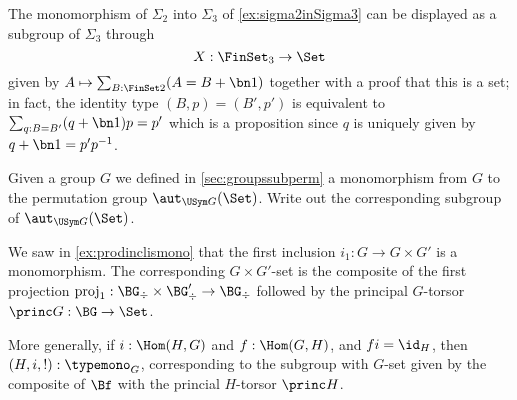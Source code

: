 %
  \begin{example}
    The monomorphism of $\Sigma_2$ into $\Sigma_3$ of \cref{ex:sigma2inSigma3} can be displayed as a subgroup of $\Sigma_3$ through
    $$X:\FinSet_3\to\Set
    $$
    given by $A\mapsto\sum_{B:\FinSet 2}(A=B+\bn 1)$ together with a proof that this is a set; in fact, the identity type $(B,p)=(B',p')$ is equivalent to $\sum_{q:B=B'}(q+\bn 1)p=p'$ which is a proposition since $q$ is uniquely given by $q+\bn 1=p'p^{-1}$.
  \end{example}
  \begin{xca}
    Given a group $G$ we defined in \cref{sec:groupssubperm} a monomorphism from $G$ to the permutation group $\aut_{\USym G}(\Set)$. Write out the corresponding subgroup of $\aut_{\USym G}(\Set)$.
  \end{xca}
\begin{example}
  \label{ex:prodinclisGset}
  We saw in \cref{ex:prodinclismono} that the first inclusion $i_1:G\to G\times G'$ is a monomorphism.
  The corresponding $G\times G'$-set is the composite of the first projection $\mathrm{proj}_1:\BG_\div\times\BG'_\div\to \BG_\div$ followed by the principal $G$-torsor $\princ G:\BG\to\Set$.

  More generally, if $i:\Hom(H,G)$ and $f:\Hom(G,H)$, and $fi=\id_H$, then $(H,i,!):\typemono_G$, corresponding to the subgroup with $G$-set given by the composite of $\Bf$ with the princial $H$-torsor $\princ H$.
\end{example}



